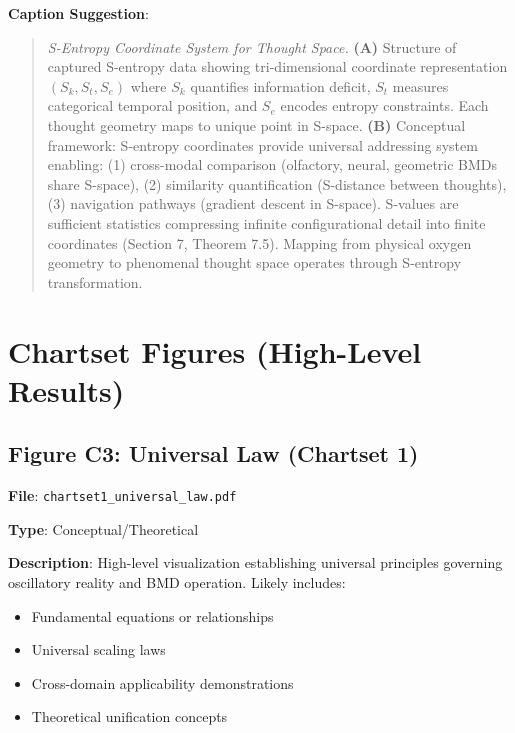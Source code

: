 \documentclass[11pt]{article}
\begin{document}
\textbf{Caption Suggestion}:
\begin{quote}
\textit{S-Entropy Coordinate System for Thought Space.} \textbf{(A)} Structure of captured S-entropy data showing tri-dimensional coordinate representation $(S_k, S_t, S_e)$ where $S_k$ quantifies information deficit, $S_t$ measures categorical temporal position, and $S_e$ encodes entropy constraints. Each thought geometry maps to unique point in S-space. \textbf{(B)} Conceptual framework: S-entropy coordinates provide universal addressing system enabling: (1) cross-modal comparison (olfactory, neural, geometric BMDs share S-space), (2) similarity quantification (S-distance between thoughts), (3) navigation pathways (gradient descent in S-space). S-values are sufficient statistics compressing infinite  configurational detail into finite coordinates (Section 7, Theorem 7.5). Mapping from physical oxygen geometry to phenomenal thought space operates through S-entropy transformation.
\end{quote}

\newpage

\section{Chartset Figures (High-Level Results)}

\subsection{Figure C3: Universal Law (Chartset 1)}


\textbf{File}: \texttt{chartset1\_universal\_law.pdf}

\textbf{Type}: Conceptual/Theoretical

\textbf{Description}:
High-level visualization establishing universal principles governing oscillatory reality and BMD operation. Likely includes:
\begin{itemize}
\item Fundamental equations or relationships
\item Universal scaling laws
\item Cross-domain applicability demonstrations
\item Theoretical unification concepts
\end{itemize}
\end{document}
